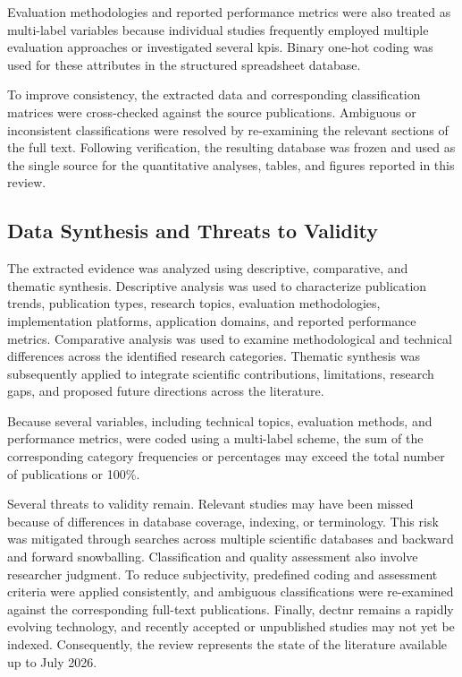 Evaluation methodologies and reported performance metrics were also treated
as multi-label variables because individual studies frequently employed
multiple evaluation approaches or investigated several \glspl{kpi}. Binary
one-hot coding was used for these attributes in the structured spreadsheet
database.

To improve consistency, the extracted data and corresponding classification
matrices were cross-checked against the source publications. Ambiguous or
inconsistent classifications were resolved by re-examining the relevant
sections of the full text. Following verification, the resulting database
was frozen and used as the single source for the quantitative analyses,
tables, and figures reported in this review.

\subsection{Data Synthesis and Threats to Validity}
\label{subsec:data_synthesis}

The extracted evidence was analyzed using descriptive, comparative, and
thematic synthesis. Descriptive analysis was used to characterize publication
trends, publication types, research topics, evaluation methodologies,
implementation platforms, application domains, and reported performance
metrics. Comparative analysis was used to examine methodological and
technical differences across the identified research categories. Thematic
synthesis was subsequently applied to integrate scientific contributions,
limitations, research gaps, and proposed future directions across the
literature.

Because several variables, including technical topics, evaluation methods,
and performance metrics, were coded using a multi-label scheme, the sum of
the corresponding category frequencies or percentages may exceed the total
number of publications or 100\%.

Several threats to validity remain. Relevant studies may have been missed
because of differences in database coverage, indexing, or terminology. This
risk was mitigated through searches across multiple scientific databases and
backward and forward snowballing. Classification and quality assessment also
involve researcher judgment. To reduce subjectivity, predefined coding and
assessment criteria were applied consistently, and ambiguous classifications
were re-examined against the corresponding full-text publications. Finally,
\gls{dectnr} remains a rapidly evolving technology, and recently accepted or
unpublished studies may not yet be indexed. Consequently, the review
represents the state of the literature available up to July 2026.